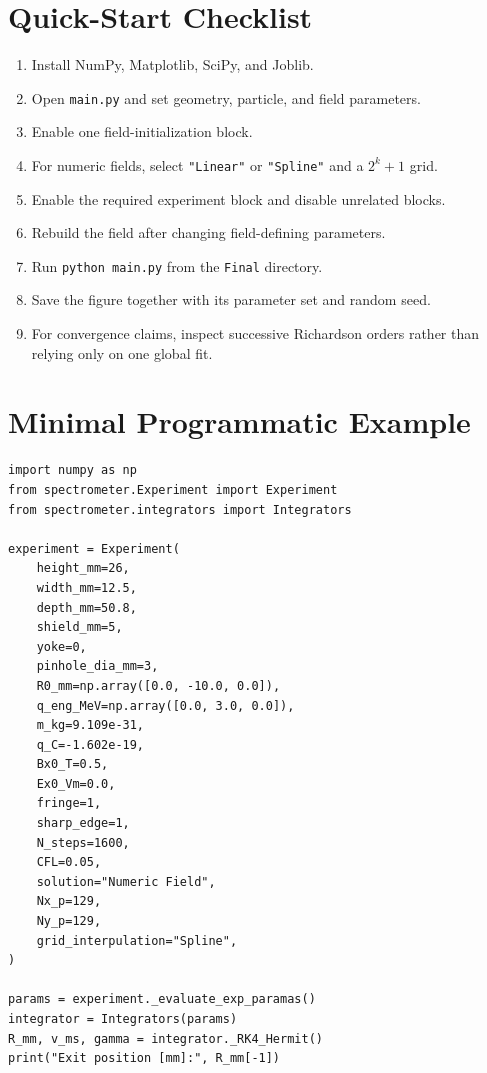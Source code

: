 \documentclass[11pt,a4paper]{report}
\newcommand{\code}[1]{\texttt{#1}}
\begin{document}
\chapter{Quick-Start Checklist}

\begin{enumerate}
  \item Install NumPy, Matplotlib, SciPy, and Joblib.
  \item Open \code{main.py} and set geometry, particle, and field parameters.
  \item Enable one field-initialization block.
  \item For numeric fields, select \code{"Linear"} or \code{"Spline"} and a
        $2^k+1$ grid.
  \item Enable the required experiment block and disable unrelated blocks.
  \item Rebuild the field after changing field-defining parameters.
  \item Run \code{python main.py} from the \code{Final} directory.
  \item Save the figure together with its parameter set and random seed.
  \item For convergence claims, inspect successive Richardson orders rather
        than relying only on one global fit.
\end{enumerate}

\appendix
\chapter{Minimal Programmatic Example}

\begin{lstlisting}
import numpy as np
from spectrometer.Experiment import Experiment
from spectrometer.integrators import Integrators

experiment = Experiment(
    height_mm=26,
    width_mm=12.5,
    depth_mm=50.8,
    shield_mm=5,
    yoke=0,
    pinhole_dia_mm=3,
    R0_mm=np.array([0.0, -10.0, 0.0]),
    q_eng_MeV=np.array([0.0, 3.0, 0.0]),
    m_kg=9.109e-31,
    q_C=-1.602e-19,
    Bx0_T=0.5,
    Ex0_Vm=0.0,
    fringe=1,
    sharp_edge=1,
    N_steps=1600,
    CFL=0.05,
    solution="Numeric Field",
    Nx_p=129,
    Ny_p=129,
    grid_interpulation="Spline",
)

params = experiment._evaluate_exp_paramas()
integrator = Integrators(params)
R_mm, v_ms, gamma = integrator._RK4_Hermit()
print("Exit position [mm]:", R_mm[-1])
\end{lstlisting}
\end{document}
